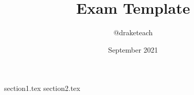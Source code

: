 \documentclass[12pt]{extarticle}    %
\title{Exam Template}       %
\author{@draketeach}        %
\date{September 2021}       %
\begin{document}

{section1.tex}
\newpage
{section2.tex}
\newpage
\blankpage                      %
\end{document}
